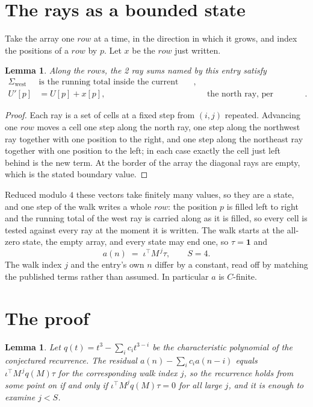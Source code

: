 \documentclass[11pt,a4paper]{article}
\theoremstyle{plain}
\newtheorem{lemma}[theorem]{Lemma}
\theoremstyle{definition}
\begin{document}
\section{The rays as a bounded state}

Take the array one $row$ at a time, in the direction in which it grows, and index the
positions of a $row $ by $p$. Let $x$ be the $row$ just written.

\begin{lemma}\label{lem:rays}
Along the $row$s, the 2 ray sums named by this entry satisfy
\[
\begin{aligned}
\Sigma_{\mathrm{west}}\ &\text{is the running total inside the current row},\\
U'[p]&=U[p]+x[p], &&\text{the north ray, per position} .
\end{aligned}
\]
\end{lemma}

\begin{proof}
Each ray is a set of cells at a fixed step from $(i,j)$ repeated. Advancing one $row$
moves a cell one step along the north ray, one step along the northwest ray together with one
position to the right, and one step along the northeast ray together with one position to the
left; in each case exactly the cell just left behind is the new term. At the border of the
array the diagonal rays are empty, which is the stated boundary value.
\end{proof}

Reduced modulo $4$ these vectors take finitely many values, so they are a state, and one step
of the walk writes a whole $row$: the position $p$ is filled left to right and the
running total of the west ray is carried along as it is filled, so every cell is tested
against every ray at the moment it is written. The walk starts at the all-zero state, the empty
array, and every state may end one, so $\tau=\mathbf{1}$ and
\[
a(n)\;=\;\iota^{\!\top}M^{\,j}\tau ,\qquad S=4.
\]
The walk index $j$ and the entry's own $n$ differ by a constant, read off by matching the
published terms rather than assumed. In particular $a$ is $C$-finite.

\section{The proof}

\begin{lemma}\label{lem:crit}
Let $q(t)=t^{3}-\sum_i c_it^{3-i}$ be the characteristic polynomial of the
conjectured recurrence. The residual $a(n)-\sum_ic_ia(n-i)$ equals
$\iota^{\!\top}M^{\,j}q(M)\tau$ for the corresponding walk index $j$, so the recurrence
holds from some point on if and only if $\iota^{\!\top}M^{j}q(M)\tau=0$ for all large $j$,
and it is enough to examine $j<S$.
\end{lemma}
\end{document}
